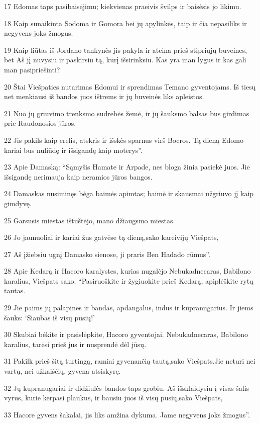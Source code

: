 \par 17 Edomas taps pasibaisėjimu; kiekvienas praeivis švilps ir baisėsis jo likimu. 
\par 18 Kaip sunaikinta Sodoma ir Gomora bei jų apylinkės, taip ir čia nepasiliks ir negyvens joks žmogus. 
\par 19 Kaip liūtas iš Jordano tankynės jis pakyla ir ateina prieš stipriųjų buveines, bet Aš jį nuvysiu ir paskirsiu tą, kurį išsirinksiu. Kas yra man lygus ir kas gali man pasipriešinti? 
\par 20 Štai Viešpaties nutarimas Edomui ir sprendimas Temano gyventojams. Iš tiesų net menkiausi iš bandos juos ištrems ir jų buveinės liks apleistos. 
\par 21 Nuo jų griuvimo trenksmo sudrebės žemė, ir jų šauksmo balsas bus girdimas prie Raudonosios jūros. 
\par 22 Jis pakils kaip erelis, atskris ir išskės sparnus virš Bocros. Tą dieną Edomo kariai bus nuliūdę ir išsigandę kaip moterys”. 
\par 23 Apie Damaską: “Sąmyšis Hamate ir Arpade, nes bloga žinia pasiekė juos. Jie išsigandę nerimauja kaip neramios jūros bangos. 
\par 24 Damaskas nusiminęs bėga baimės apimtas; baimė ir skausmai užgriuvo jį kaip gimdyvę. 
\par 25 Garsusis miestas ištuštėjo, mano džiaugsmo miestas. 
\par 26 Jo jaunuoliai ir kariai žus gatvėse tą dieną,­sako kareivijų Viešpats,­ 
\par 27 Aš įžiebsiu ugnį Damasko sienose, ji praris Ben Hadado rūmus”. 
\par 28 Apie Kedarą ir Hacoro karalystes, kurias nugalėjo Nebukadnecaras, Babilono karalius, Viešpats sako: “Pasiruoškite ir žygiuokite prieš Kedarą, apiplėškite rytų tautas. 
\par 29 Jie paims jų palapines ir bandas, apdangalus, indus ir kupranugarius. Ir jiems šauks: ‘Siaubas iš visų pusių!’ 
\par 30 Skubiai bėkite ir pasislėpkite, Hacoro gyventojai. Nebukadnecaras, Babilono karalius, tarėsi prieš jus ir nusprendė dėl jūsų. 
\par 31 Pakilk prieš šitą turtingą, ramiai gyvenančią tautą,­sako Viešpats.­Jie neturi nei vartų, nei užkaiščių, gyvena atsiskyrę. 
\par 32 Jų kupranugariai ir didžiulės bandos taps grobiu. Aš išsklaidysiu į visas šalis vyrus, kurie kerpasi plaukus, ir bausiu juos iš visų pusių,­sako Viešpats,­ 
\par 33 Hacore gyvens šakalai, jis liks amžina dykuma. Jame negyvens joks žmogus”. 
